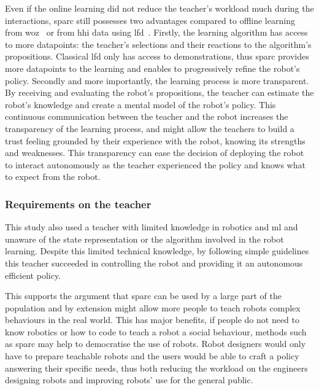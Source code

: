 Even if the online learning did not reduce the teacher's workload much during the interactions, \gls{sparc} still possesses two advantages compared to offline learning from \gls{woz}~\citep{sequeira2016discovering} or from \gls{hhi} data using \gls{lfd}~\citep{liu2014train}. Firstly, the learning algorithm has access to more datapoints: the teacher's selections and their reactions to the algorithm's propositions. Classical \gls{lfd} only has access to demonstrations, thus \gls{sparc} provides more datapoints to the learning and enables to progressively refine the robot's policy. Secondly and more importantly, the learning process is more transparent. By receiving and evaluating the robot's propositions, the teacher can estimate the robot's knowledge and create a mental model of the robot's policy. This continuous communication between the teacher and the robot increases the transparency of the learning process, and might allow the teachers to build a trust feeling grounded by their experience with the robot, knowing its strengths and weaknesses. This transparency can ease the decision of deploying the robot to interact autonomously as the teacher experienced the policy and knows what to expect from the robot.

\subsubsection{Requirements on the teacher}

This study also used a teacher with limited knowledge in robotics and \gls{ml} and unaware of the state representation or the algorithm involved in the robot learning. Despite this limited technical knowledge, by following simple guidelines this teacher succeeded in controlling the robot and providing it an autonomous efficient policy.

This supports the argument that \gls{sparc} can be used by a large part of the population and by extension might allow more people to teach robots complex behaviours in the real world. This has major benefits, if people do not need to know robotics or how to code to teach a robot a social behaviour, methods such as \gls{sparc} may help to democratise the use of robots. Robot designers would only have to prepare teachable robots and the users would be able to craft a policy answering their specific needs, thus both reducing the workload on the engineers designing robots and improving robots' use for the general public.


